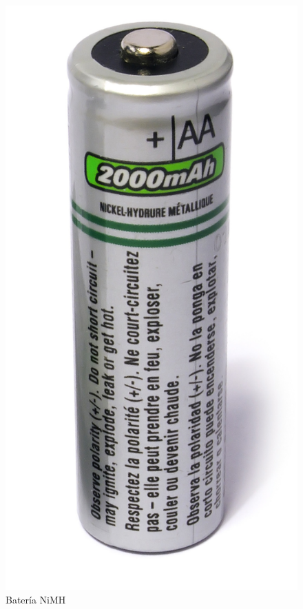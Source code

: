 \begin{figure} [H]
   \centering
   \includegraphics[scale=.1]{imagenes/NiMH.jpg}
   \caption{Batería NiMH \cite{multicherry_english_2020}}
   \label{fig:NiMH}
\end{figure}



